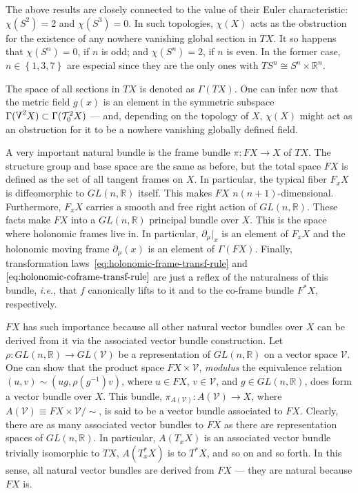 \documentclass[../../main.tex]{subfiles}
\begin{document}
The above results are closely connected to the value of their Euler characteristic: $\chi \left( S^{2} \right) = 2$ and $ \chi \left( S^{3} \right) = 0$. In such topologies, $\chi \left( X \right)$ acts as the obstruction for the existence of any nowhere vanishing global section in $TX$. It so happens that $\chi \left( S^n \right)=0$, if $n$ is odd; and $\chi \left( S^n \right)=2$, if $n$ is even. In the former case, $n \in \left\{ 1, 3, 7 \right\}$ are especial since they are the only ones with $TS^n \cong S^n \times \mathbb{R}^n$.

The space of all sections in $TX$ is denoted as $\Gamma \left( TX \right)$. One can infer now that the metric field $ g(x) $ is an element in the symmetric subspace $ \Gamma ( \text{\raisebox{\depth}{\scalebox{1}[-1]{$\Lambda$}}}^2 X ) \subset \Gamma ( \mathcal{T}^2_0 X )$ --- and, depending on the topology of $X$, $ \chi \left( X \right)$ might act as an obstruction for it to be a nowhere vanishing globally defined field.

A very important natural bundle is the frame bundle $\pi: FX \rightarrow X$ of $TX$. The structure group and base space are the same as before, but the total space $FX$ is defined as the set of all tangent frames on $X$. In particular, the typical fiber $F_x X$ is diffeomorphic to $GL\left(n, \mathbb{R}\right)$ itself. This makes $FX$ $n\left(n+1\right)$-dimensional. Furthermore, $F_x X$ carries a smooth and free right action of $GL\left(n, \mathbb{R}\right)$. These facts make $ FX $ into a $GL\left(n, \mathbb{R}\right)$ principal bundle over $X$. This is the space where holonomic frames live in. In particular, $\partial_\mu|_x$ is an element of $F_x X$ and the holonomic moving frame $\partial_\mu \left(x\right)$ is an element of $\Gamma\left(FX\right)$. Finally, transformation laws~\eqref{eq:holonomic-frame-transf-rule} and $\eqref{eq:holonomic-coframe-transf-rule}$ are just a reflex of the naturalness of this bundle, \textit{i.e.}, that $f$ canonically lifts to it and to the co-frame bundle $F^* X$, respectively.

$FX$ has such importance because all other natural vector bundles over $X$ can be derived from it via the associated vector bundle construction. Let $\rho: GL\left(n, \mathbb{R}\right) \rightarrow GL\left(\mathcal{V}\right)$ be a representation of $GL\left(n, \mathbb{R}\right)$ on a vector space $\mathcal{V}$. One can show that the product space $FX \times \mathcal{V}$, \textit{modulus} the equivalence relation $ \left(u, v\right) \sim \left(u g, \rho\left(g^{-1}\right)v\right)$, where $ u \in FX $, $v \in\mathcal{V}$, and $ g\in GL\left(n, \mathbb{R}\right)$, does form a vector bundle over $X$. This bundle, $\pi_{ A \left( \mathcal{V} \right) }: A\left(\mathcal{V}\right)\rightarrow X$, where $A\left(\mathcal{V}\right)\equiv FX \times \mathcal{V}/\sim$, is said to be a vector bundle associated to $FX$. Clearly, there are as many associated vector bundles to $FX$ as there are representation spaces of $GL\left(n, \mathbb{R}\right)$. In particular, $ A \left( T_x X\right ) $ is an associated vector bundle trivially isomorphic to $TX$, $ A \left( {T}^*_x X \right) $ is to $T^*X$, and so on and so forth. In this sense, all natural vector bundles are derived from $FX$ --- they are natural because $ FX $ is.
\end{document}
